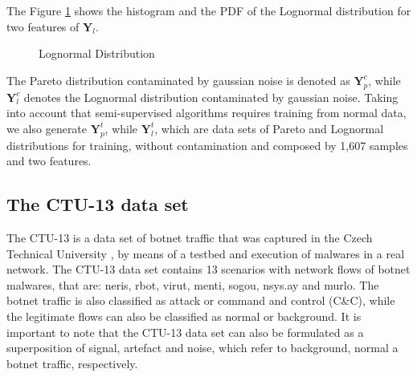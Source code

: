 The Figure \ref{fig:4.06} shows the histogram and the PDF of the Lognormal distribution for two features of $\boldsymbol{Y}_l$.

\begin{figure}[!htb]
	\centering
	\caption[Lognormal Distribution]{Lognormal Distribution}
	\label{fig:4.06}
\end{figure}

The Pareto distribution contaminated by gaussian noise is denoted as $\boldsymbol{Y}_p^c$, while $\boldsymbol{Y}_l^c$ denotes the Lognormal distribution contaminated by gaussian noise. Taking into account that semi-supervised algorithms requires training from normal data, we also generate $\boldsymbol{Y}_p^t$, while $\boldsymbol{Y}_l^t$, which are data sets of Pareto and Lognormal distributions for training, without contamination and composed by 1,607 samples and two features.

\subsection{The CTU-13 data set}
\label{sec:4_CTU-13}

The CTU-13 is a data set of botnet traffic that was captured in the Czech Technical University \cite{garcia2014empirical}, by means of a testbed and execution of malwares in a real network. The CTU-13 data set contains 13 scenarios with network flows of botnet malwares, that are: neris, rbot, virut, menti, sogou, nsys.ay and murlo. The botnet traffic is also classified as attack or command and control (C\&C), while the legitimate flows can also be classified as normal or background. It is important to note that the CTU-13 data set can also be formulated as a superposition of signal, artefact and noise, which refer to background, normal a botnet traffic, respectively.

